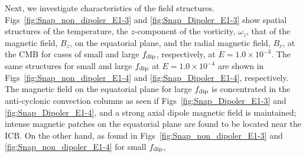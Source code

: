 {\color{blue}
Next, we investigate characteristics of the field structures.
Figs~\ref{fig:Snap_non_dipoler_E1-3} and \ref{fig:Snap_Dipoler_E1-3} show spatial structures of the temperature, the $z$-component of the vorticity, $\omega_z$, that of the magnetic field, $B_z$, on the equatorial plane, and the radial magnetic field, $B_r$, at the CMB for cases of small and large $f_{\rm dip}$, respectively, at $E = 1.0 \times 10^{-3}$.
The same structures for small and large $f_{\rm dip}$ at $E = 1.0 \times 10^{-4}$ are shown in Figs~\ref{fig:Snap_non_dipoler_E1-4} and \ref{fig:Snap_Dipoler_E1-4}, respectively.
}
{\color{blue}
The magnetic field on the equatorial plane for large $f_{\rm dip}$ is concentrated in the anti-cyclonic convection columns as seen if Figs~\ref{fig:Snap_Dipoler_E1-3} and \ref{fig:Snap_Dipoler_E1-4}, and a strong axial dipole magnetic field is maintained; intense magnetic patches on the equatorial plane are found to be located near the ICB.
%
On the other hand, as found in Figs~\ref{fig:Snap_non_dipoler_E1-3} and \ref{fig:Snap_non_dipoler_E1-4} for small $f_{\rm dip}$,
}

